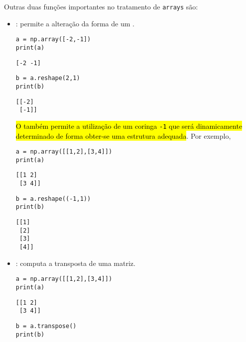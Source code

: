 Outras duas funções importantes no tratamento de \texttt{arrays} são:
\begin{itemize}
\item \hl{\PYTHONnumpyDOTreshape}: permite a alteração da forma de um {\PYTHONnumpyDOTarray}.
  
\begin{lstlisting}
a = np.array([-2,-1])
print(a)
\end{lstlisting}

\begin{verbatim}
[-2 -1]
\end{verbatim}

\begin{lstlisting}
b = a.reshape(2,1)
print(b)
\end{lstlisting}

\begin{verbatim}
[[-2]
 [-1]]
\end{verbatim}

\hl{O {\PYTHONnumpyDOTreshape} também permite a utilização de um coringa \texttt{-1} que será dinamicamente determinado de forma obter-se uma estrutura adequada}. Por exemplo,

\begin{lstlisting}
a = np.array([[1,2],[3,4]])
print(a)
\end{lstlisting}

\begin{verbatim}
[[1 2]
 [3 4]]
\end{verbatim}

\begin{lstlisting}
b = a.reshape((-1,1))
print(b)
\end{lstlisting}

\begin{verbatim}
[[1]
 [2]
 [3]
 [4]]
\end{verbatim}

\item \hl{\PYTHONnumpyDOTtranspose}: computa a transposta de uma matriz.

\begin{lstlisting}
a = np.array([[1,2],[3,4]])
print(a)
\end{lstlisting}

\begin{verbatim}
[[1 2]
 [3 4]]
\end{verbatim}

\begin{lstlisting}
b = a.transpose()
print(b)
\end{lstlisting}


\end{itemize}
